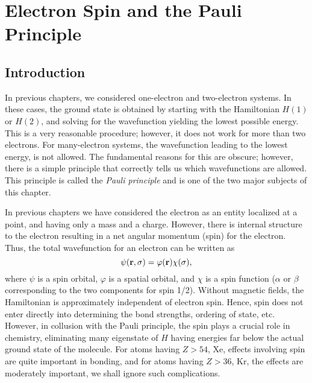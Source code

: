 \chapter{Electron Spin and the Pauli Principle}
\label{chap04}

\section{Introduction}

In previous chapters, we considered one-electron and two-electron
systems. In these cases, the ground state is obtained by starting with
the Hamiltonian $H(1)$ or $H(2)$, and solving for the wavefunction
yielding the lowest possible energy. This is a very reasonable
procedure; however, it does not work for more than two electrons. For
many-electron systems, the wavefunction leading to the lowest energy,
is not allowed.  The fundamental reasons for this are obscure;
however, there is a simple principle that correctly tells us which
wavefunctions are allowed.  This principle is called the \emph{Pauli
principle} and is one of the two major subjects of this chapter.

In previous chapters we have considered the electron as an entity
localized at a point, and having only a mass and a charge. However,
there is internal structure to the electron resulting in a net angular
momentum (spin) for the electron. Thus, the total wavefunction for an
electron can be written as
\begin{equation}
\psi ( {\bf r} , \sigma ) = \varphi ({\bf r}) \chi ( \sigma ) ,
\end{equation}
where $\psi$ is a spin orbital, $\varphi$ is a spatial orbital, and $\chi$ 
is a spin function ($\alpha$ or $\beta$ corresponding to the two 
components for spin 1/2).  Without magnetic fields, the
Hamiltonian is approximately independent of electron spin.  Hence, spin 
does not enter directly into determining the bond strengths, ordering of 
state, etc.  However, in collusion with the Pauli principle, the spin 
plays a crucial role in chemistry, eliminating many eigenstate of $H$ 
having energies far below the actual ground state of the molecule.  For 
atoms having $Z > 54$, Xe, effects involving spin are quite important in 
bonding, and for atoms having $Z > 36$, Kr, the effects are moderately 
important, we shall ignore such complications.

